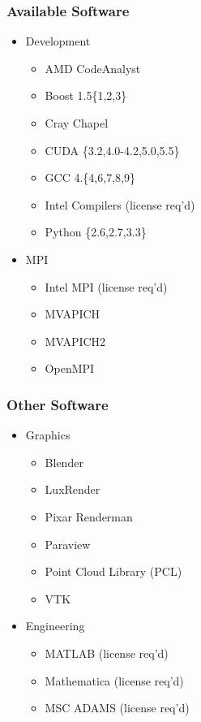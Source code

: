 \begin{frame}\frametitle{Available Software}

\begin{itemize}
\itemsep1pt\parskip0pt
\item
  Development

  \begin{itemize}
  \itemsep1pt\parskip0pt
  \item
    AMD CodeAnalyst
  \item
    Boost 1.5\{1,2,3\}
  \item
    Cray Chapel
  \item
    CUDA \{3.2,4.0-4.2,5.0,5.5\}
  \item
    GCC 4.\{4,6,7,8,9\}
  \item
    Intel Compilers (license req'd)
  \item
    Python \{2.6,2.7,3.3\}
  \end{itemize}
\item
  MPI

  \begin{itemize}
  \itemsep1pt\parskip0pt
  \item
    Intel MPI (license req'd)
  \item
    MVAPICH
  \item
    MVAPICH2
  \item
    OpenMPI
  \end{itemize}
\end{itemize}

\end{frame}

\begin{frame}\frametitle{Other Software}

\begin{itemize}
\itemsep1pt\parskip0pt
\item
  Graphics

  \begin{itemize}
  \itemsep1pt\parskip0pt
  \item
    Blender
  \item
    LuxRender
  \item
    Pixar Renderman
  \item
    Paraview
  \item
    Point Cloud Library (PCL)
  \item
    VTK
  \end{itemize}
\item
  Engineering

  \begin{itemize}
  \itemsep1pt\parskip0pt
  \item
    MATLAB (license req'd)
  \item
    Mathematica (license req'd)
  \item
    MSC ADAMS (license req'd)
  \end{itemize}
\end{itemize}

\end{frame}

